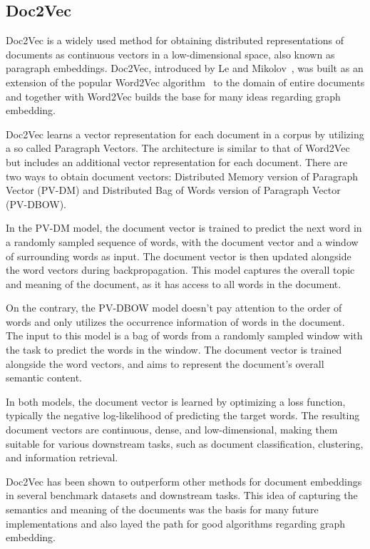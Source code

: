 \subsection{Doc2Vec}
Doc2Vec is a widely used method for obtaining distributed representations of documents as continuous vectors in a low-dimensional space, also known as paragraph embeddings. Doc2Vec, introduced by Le and Mikolov~\cite{2014doc2vec}, was built as an extension of the popular Word2Vec algorithm~\cite{mikolov2013distributed} to the domain of entire documents and together with Word2Vec builds the base for many ideas regarding graph embedding.

Doc2Vec learns a vector representation for each document in a corpus by utilizing a so called Paragraph Vectors. The architecture is similar to that of Word2Vec but includes an additional vector representation for each document. There are two ways to obtain document vectors: Distributed Memory version of Paragraph Vector (PV-DM) and Distributed Bag of Words version of Paragraph Vector (PV-DBOW).

In the PV-DM model, the document vector is trained to predict the next word in a randomly sampled sequence of words, with the document vector and a window of surrounding words as input. The document vector is then updated alongside the word vectors during backpropagation. This model captures the overall topic and meaning of the document, as it has access to all words in the document.

On the contrary, the PV-DBOW model doesn't pay attention to the order of words and only utilizes the occurrence information of words in the document. The input to this model is a bag of words from a randomly sampled window with the task to predict the words in the window. The document vector is trained alongside the word vectors, and  aims to represent the document's overall semantic content.

In both models, the document vector is learned by optimizing a loss function, typically the negative log-likelihood of predicting the target words. The resulting document vectors are continuous, dense, and low-dimensional, making them suitable for various downstream tasks, such as document classification, clustering, and information retrieval.

Doc2Vec has been shown to outperform other methods for document embeddings in several benchmark datasets and downstream tasks. This idea of capturing the semantics and meaning of the documents was the basis for many future implementations and also layed the path for good algorithms regarding graph embedding.

